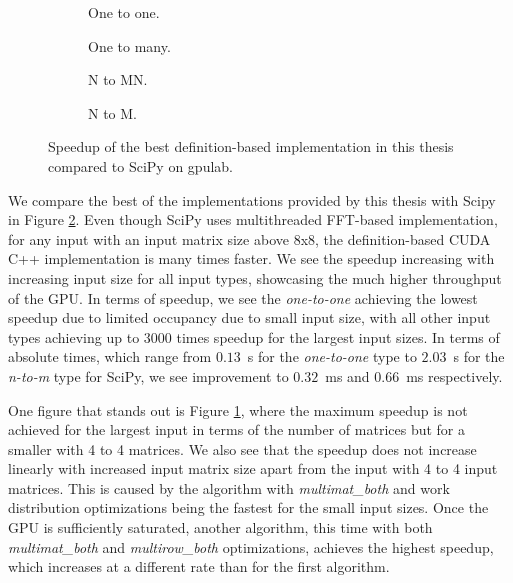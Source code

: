 \begin{figure}[ht]
	\centering	
	\begin{subfigure}{0.4\textwidth}
		\centering
		\def\svgwidth{\textwidth}
		
		\caption{One to one.}
	\end{subfigure}
	\begin{subfigure}{0.4\textwidth}
		\centering
		\def\svgwidth{\textwidth}
		
		\caption{One to many.}
	\end{subfigure}
	\begin{subfigure}{0.4\textwidth}
		\centering
		\def\svgwidth{\textwidth}
		
		\caption{N to MN.}
	\end{subfigure}
	\begin{subfigure}{0.4\textwidth}
		\centering
		\def\svgwidth{\textwidth}
		
		\caption{N to M.}
		\label{fig:scipy_n_to_m_gpulab}
	\end{subfigure}
	\caption{Speedup of the best definition-based implementation in this thesis compared to SciPy on gpulab.}
	\label{fig:scipy_speedup_gpulab}
\end{figure}


We compare the best of the implementations provided by this thesis with Scipy in Figure \ref{fig:scipy_speedup_gpulab}. Even though SciPy uses multithreaded FFT-based implementation, for any input with an input matrix size above 8x8, the definition-based CUDA C++ implementation is many times faster. We see the speedup increasing with increasing input size for all input types, showcasing the much higher throughput of the GPU. In terms of speedup, we see the \textit{one-to-one} achieving the lowest speedup due to limited occupancy due to small input size, with all other input types achieving up to $3000$ times speedup for the largest input sizes. In terms of absolute times, which range from $0.13$~s for the \textit{one-to-one} type to $2.03$~s for the \textit{n-to-m} type for SciPy, we see improvement to $0.32$~ms and $0.66$~ms respectively.

One figure that stands out is Figure \ref{fig:scipy_n_to_m_gpulab}, where the maximum speedup is not achieved for the largest input in terms of the number of matrices but for a smaller with 4 to 4 matrices. We also see that the speedup does not increase linearly with increased input matrix size apart from the input with 4 to 4 input matrices. This is caused by the algorithm with \textit{multimat\_both} and work distribution optimizations being the fastest for the small input sizes. Once the GPU is sufficiently saturated, another algorithm, this time with both \textit{multimat\_both} and \textit{multirow\_both} optimizations, achieves the highest speedup, which increases at a different rate than for the first algorithm.

